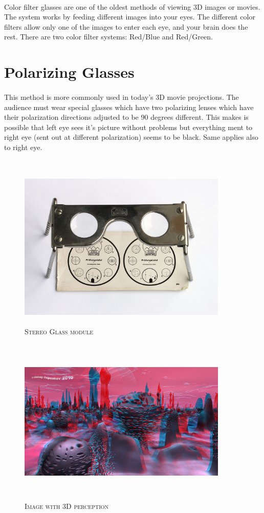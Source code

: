 \paragraph{} Color filter glasses are one of the oldest methods of viewing 3D images or movies. The system works by feeding different images into your eyes. The different color filters allow only one of the images to enter each eye, and your brain does the rest. There are two color filter systems: Red/Blue and Red/Green.

\section{Polarizing Glasses}
\paragraph{} This method is more commonly used in today's 3D movie projections. The audience must wear special glasses which have two polarizing lenses which have their polarization directions adjusted to be 90 degrees different. This makes is possible that left eye sees it's picture without problems but everything ment to right eye (sent out at different polarization) seems to be black. Same applies also to right eye.\\\\

\begin{figure}[H]
	\centering
	\includegraphics[height= 8cm, width=10cm]{project/images/st.jpg}
	\caption{\textsc{Stereo Glass module}}
\end{figure}

\begin{figure}[H]
	\centering
	\includegraphics[height= 8cm, width=10cm]{project/images/de.png}
	\caption{\textsc{Image with 3D perception}}
\end{figure}